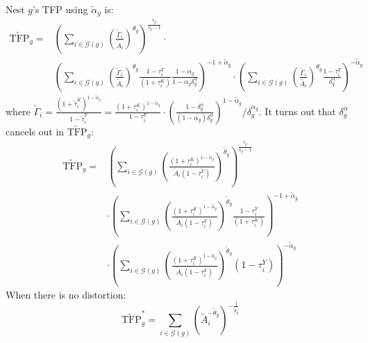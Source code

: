 \documentclass[12pt]{article}
\begin{document}
Nest $g$'s TFP using $\tilde{\alpha}_g$ is:
\begin{align*}
\widetilde{\text{TFP}}_g=&\left( \sum_{i\in\mathcal{G}(g)}\left( \frac{\tilde{\Gamma}_i}{\tilde{A}_i} \right)^{\theta_g} \right)^{\frac{\epsilon_g}{\epsilon_g-1}} \cdot \\
&\left( \sum_{i\in\mathcal{G}(g)}\left( \frac{\tilde{\Gamma}_i}{\tilde{A}_i} \right)^{\theta_g} \frac{1-\tau_i^Y}{(1+\tau_i^K)}\frac{1-\alpha_g}{1-\alpha_g\delta_g^{\alpha}}\right)^{-1+\tilde{\alpha}_g} \cdot \left( \sum_{i\in\mathcal{G}(g)}\left( \frac{\tilde{\Gamma}_i}{\tilde{A}_i} \right)^{\theta_g} \frac{1-\tau_i^Y}{\delta_g^{\alpha}}\right)^{-\tilde{\alpha}_g} 
\end{align*}
where $\tilde{\Gamma}_i=\frac{(1+\tilde{\tau}_i^K)^{1-\tilde{\alpha}_g}}{1-\tilde{\tau}_i^Y}=\frac{(1+\tau_i^K)^{1-\tilde{\alpha}_g}}{1-\tau_i^Y}\cdot \left( \frac{1-\delta_g^{\alpha}}{(1-\alpha_g)\delta_g^{\alpha}} \right)^{1-\tilde{\alpha}_g}/\delta_g^{\alpha_g}$. It turns out that $\delta_g^{\alpha}$ cancels out in $\widetilde{\text{TFP}}_g$:
\begin{align*}
\widetilde{\text{TFP}}_g=&\left( \sum_{i\in\mathcal{G}(g)}\left( \frac{(1+\tau_i^K)^{1-\tilde{\alpha}_g}}{\tilde{A}_i(1-\tau_i^Y)} \right)^{\tilde{\theta}_g} \right)^{\frac{\epsilon_g}{\epsilon_g-1}} \\
& \cdot \left( \sum_{i\in\mathcal{G}(g)}\left( \frac{(1+\tau_i^K)^{1-\tilde{\alpha}_g}}{\tilde{A}_i(1-\tau_i^Y)} \right)^{\tilde{\theta}_g} \frac{1-\tau_i^Y}{(1+\tau_i^K)}\right)^{-1+\tilde{\alpha}_g}\\
& \cdot \left( \sum_{i\in\mathcal{G}(g)}\left( \frac{(1+\tau_i^K)^{1-\tilde{\alpha}_g}}{\tilde{A}_i(1-\tau_i^Y)} \right)^{\tilde{\theta}_g} (1-\tau_i^Y)\right)^{-\tilde{\alpha}_g} 
\end{align*}
When there is no distortion:
$$\widetilde{\text{TFP}}_g^*= \sum_{i \in \mathcal{G}(g)}\left( \tilde{A}_i^{-\tilde{\theta}_g} \right)^{-\frac{1}{\tilde{\theta}_g}}$$
\end{document}
